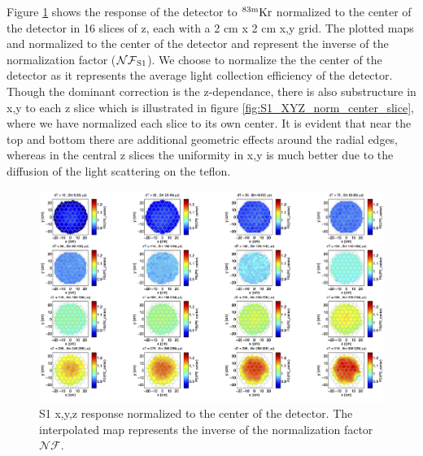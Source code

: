 Figure \ref{fig:S1_XYZ_norm_center} shows the response of the detector to $\rm^{83m}Kr$ normalized to the center of the detector in 16 slices of z, each with a 2 cm x 2 cm x,y grid. The plotted maps and normalized to the center of the detector and represent the inverse of the normalization factor ($\rm \mathcal{NF}_{S1}$). We choose to normalize the the center of the detector as it represents the average light collection efficiency of the detector. Though the dominant correction is the z-dependance, there is also substructure in x,y to each z slice which is illustrated in figure \ref{fig:S1_XYZ_norm_center_slice}, where we have normalized each slice to its own center. It is evident that near the top and bottom there are additional geometric effects around the radial edges, whereas in the central z slices the uniformity in x,y is much better due to the diffusion of the light scattering on the teflon.

\renewcommand{\baselinestretch}{1}
\small\normalsize
\begin{figure}\centering
\includegraphics[width=230mm]{Chapter_XYZ_Corr/Thesis_Corr_Plots/S1_XYZ_Kr_norm_center_crop_80.png}
\caption{S1 x,y,z response normalized to the center of the detector. The interpolated map represents the inverse of the normalization factor $\mathcal{NF}$. }
\label{fig:S1_XYZ_norm_center}
\end{figure}
\renewcommand{\baselinestretch}{2}
\small\normalsize

